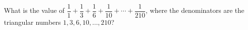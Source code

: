 What is the value of $\dfrac{1}{1}+\dfrac{1}{3}+\dfrac{1}{6}+\dfrac{1}{10}+\cdots+\dfrac{1}{210}$, where the denominators are the triangular numbers $1,3,6,10,\dots,210$?
